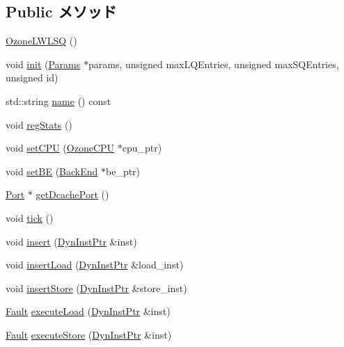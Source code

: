 \subsection*{Public メソッド}
\begin{DoxyCompactItemize}
\item 
\hyperlink{classOzoneLWLSQ_aa933366a7f11b182f805d690c533776a}{OzoneLWLSQ} ()
\item 
void \hyperlink{classOzoneLWLSQ_ae8565b0968a8115705f1585e8aa21f75}{init} (\hyperlink{classOzoneLWLSQ_a818e103eae798a24a06a0a34631849ea}{Params} $\ast$params, unsigned maxLQEntries, unsigned maxSQEntries, unsigned id)
\item 
std::string \hyperlink{classOzoneLWLSQ_a37627d5d5bba7f4a8690c71c2ab3cb07}{name} () const 
\item 
void \hyperlink{classOzoneLWLSQ_a4dc637449366fcdfc4e764cdf12d9b11}{regStats} ()
\item 
void \hyperlink{classOzoneLWLSQ_ab8056057b67b41f234f56940cc115cc1}{setCPU} (\hyperlink{classOzoneCPU}{OzoneCPU} $\ast$cpu\_\-ptr)
\item 
void \hyperlink{classOzoneLWLSQ_a9134276ed85820d74779ad5826580822}{setBE} (\hyperlink{classBackEnd}{BackEnd} $\ast$be\_\-ptr)
\item 
\hyperlink{classPort}{Port} $\ast$ \hyperlink{classOzoneLWLSQ_a32e64f82b805fe23a17b01dda0f44fb0}{getDcachePort} ()
\item 
void \hyperlink{classOzoneLWLSQ_a873dd91783f9efb4a590aded1f70d6b0}{tick} ()
\item 
void \hyperlink{classOzoneLWLSQ_a773e88db1aa010c3755e603493bf40ec}{insert} (\hyperlink{classOzoneLWLSQ_a028ce10889c5f6450239d9e9a7347976}{DynInstPtr} \&inst)
\item 
void \hyperlink{classOzoneLWLSQ_ad22b3ecafed2bcd9c59fcab049a1cb98}{insertLoad} (\hyperlink{classOzoneLWLSQ_a028ce10889c5f6450239d9e9a7347976}{DynInstPtr} \&load\_\-inst)
\item 
void \hyperlink{classOzoneLWLSQ_a6a4b4e51bfff3639932ebaba45e8a282}{insertStore} (\hyperlink{classOzoneLWLSQ_a028ce10889c5f6450239d9e9a7347976}{DynInstPtr} \&store\_\-inst)
\item 
\hyperlink{classRefCountingPtr}{Fault} \hyperlink{classOzoneLWLSQ_a30c6332142c2ecca389ed6ee463c692b}{executeLoad} (\hyperlink{classOzoneLWLSQ_a028ce10889c5f6450239d9e9a7347976}{DynInstPtr} \&inst)
\item 
\hyperlink{classRefCountingPtr}{Fault} \hyperlink{classOzoneLWLSQ_aad78b8a37ee5c61e47df58dd39980340}{executeStore} (\hyperlink{classOzoneLWLSQ_a028ce10889c5f6450239d9e9a7347976}{DynInstPtr} \&inst)

\end{DoxyCompactItemize}

